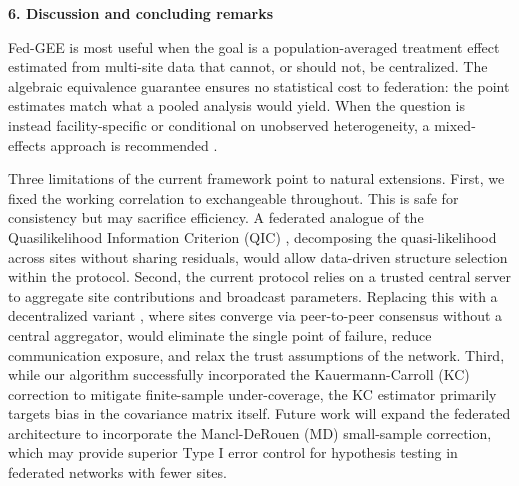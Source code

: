 \documentclass[useAMS,referee, usegraphicx]{biom}
\begin{document}
\vspace{0.5cm}
\textbf{6. Discussion and concluding remarks}
\noindent 


Fed-GEE is most useful when the goal is a population-averaged treatment effect estimated from multi-site data that cannot, or should not, be centralized. The algebraic equivalence guarantee ensures no statistical cost to federation: the point estimates match what a pooled analysis would yield. When the question is instead facility-specific or conditional on unobserved heterogeneity, a mixed-effects approach is recommended \citep{luo2022dlmm}.

Three limitations of the current framework point to natural extensions. First, we fixed the working correlation to exchangeable throughout. This is safe for consistency but may sacrifice efficiency. A federated analogue of the Quasilikelihood Information Criterion (QIC) \citep{pan2001akaike}, decomposing the quasi-likelihood across sites without sharing residuals, would allow data-driven structure selection within the protocol. Second, the current protocol relies on a trusted central server to aggregate site contributions and broadcast parameters. Replacing this  with a decentralized variant \citep{gu2024statistical}, where sites converge via peer-to-peer consensus without a central aggregator, would eliminate the single point of failure, reduce communication exposure, and relax the trust assumptions of the network. Third, while our algorithm successfully incorporated the Kauermann-Carroll (KC) correction to mitigate finite-sample under-coverage, the KC estimator primarily targets bias in the covariance matrix itself. Future work will expand the federated architecture to incorporate the Mancl-DeRouen (MD) \citep{mancl2001covariance} small-sample correction, which may provide superior Type I error control for hypothesis testing in federated networks with fewer sites. 

\label{lastpage}






\clearpage
\FloatBarrier
\end{document}
